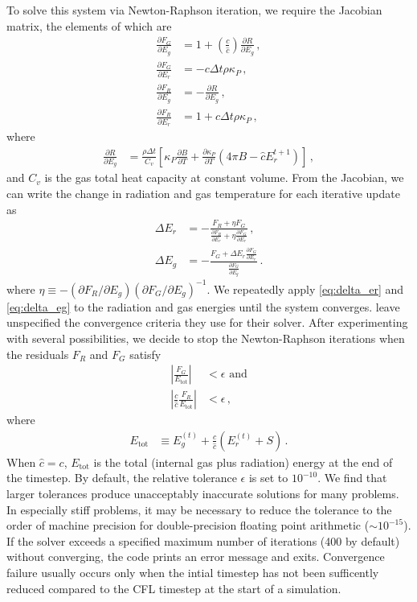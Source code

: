 \documentclass[fleqn,usenatbib]{mnras}
\begin{document}
To solve this system via Newton-Raphson iteration, we require the Jacobian matrix, the elements of which are
\begin{align}
\frac{\partial F_G}{\partial E_g} &= 1 + \left( \frac{c}{\hat c} \right) \frac{\partial R}{\partial E_g} \, , \\
\frac{\partial F_G}{\partial E_r} &= -c \Delta t \rho \kappa_P \, , \\
\frac{\partial F_R}{\partial E_g} &= -\frac{\partial R}{\partial E_g} \, , \\
\frac{\partial F_R}{\partial E_r} &= 1 + \hat c \Delta t \rho \kappa_P \, ,
\end{align}
where
\begin{align}
\frac{\partial R}{\partial E_g} &= \frac{\rho \Delta t}{C_v} \left[ \kappa_P \frac{\partial B}{\partial T} + \frac{\partial \kappa_P}{\partial T} \left( 4\pi B - \hat c E_r^{t+1} \right) \right] \, ,
\end{align}
and $C_v$ is the gas total heat capacity at constant volume. From the Jacobian, we can write the change in radiation and gas temperature for each iterative update as
\begin{align}
\label{eq:delta_er}
\Delta E_r &= -\frac{F_R + \eta F_G}{ \frac{\partial F_R}{\partial E_r} + \eta \frac{\partial F_G}{\partial E_r} } \, , \\ 
\label{eq:delta_eg}
\Delta E_g &= -\frac{F_G + \Delta E_r \frac{\partial F_G}{\partial E_r}}{ \frac{\partial F_G}{\partial E_g} } \, .
\end{align}
where $\eta \equiv - (\partial F_R/\partial E_g) ( \partial F_G/\partial E_g )^{-1}$. We repeatedly apply \autoref{eq:delta_er} and \autoref{eq:delta_eg} to the radiation and gas energies until the system converges. \citet{Howell_2003} leave unspecified the convergence criteria they use for their solver. After experimenting with several possibilities, we decide to stop the Newton-Raphson iterations when the residuals $F_R$ and $F_G$ satisfy
\begin{align}
\left| \frac{F_G}{E_{\text{tot}}} \right| &< \epsilon \, \, \text{and} \\
\left| \frac{c}{\hat c} \frac{F_R}{E_{\text{tot}}} \right| &< \epsilon \, ,
\end{align}
where
\begin{align}
E_{\text{tot}} &\equiv E_g^{(t)} + \frac{c}{\hat c} \left( E_r^{(t)} + S \right) \, .
\end{align}
When $\hat c = c$, $E_{\text{tot}}$ is the total (internal gas plus radiation) energy at the end of the timestep. By default, the relative tolerance $\epsilon$ is set to $10^{-10}$. We find that larger tolerances produce unacceptably inaccurate solutions for many problems. In especially stiff problems, it may be necessary to reduce the tolerance to the order of machine precision for double-precision floating point arithmetic ($\sim 10^{-15}$). If the solver exceeds a specified maximum number of iterations (400 by default) without converging, the code prints an error message and exits. Convergence failure usually occurs only when the intial timestep has not been sufficently reduced compared to the CFL timestep at the start of a simulation.
\end{document}
